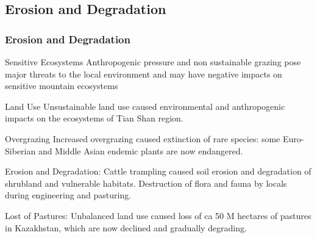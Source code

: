 \documentclass[pdflatex,compress,8pt,
	xcolor={dvipsnames,dvipsnames,svgnames,x11names,table},
	hyperref={colorlinks = true,
	breaklinks = true, 
	urlcolor = NavyBlue, 
	breaklinks = true}]{beamer}
\begin{document}
\subsection{Erosion and Degradation}
\begin{frame}\frametitle{Erosion and Degradation}

\begin{alertblock}{Sensitive Ecosystems}
Anthropogenic pressure and non sustainable grazing pose major threats to the local environment and may have negative impacts on sensitive mountain ecosystems
\end{alertblock}

\begin{block}{Land Use}
Unsustainable land use caused environmental and anthropogenic impacts on the ecosystems of Tian Shan region. 
\end{block}

\begin{block}{Overgrazing}
Increased overgrazing caused extinction of rare species: some Euro-Siberian and Middle Asian endemic plants are now endangered.
\end{block}

\begin{examples}{Erosion and Degradation:}
Cattle trampling caused soil erosion and degradation of shrubland and vulnerable habitats. Destruction of flora and fauna by locals during engineering and pasturing. 
\end{examples}

\begin{examples}{Lost of Pastures:}
Unbalanced land use caused loss of ca 50 M hectares of pastures in Kazakhstan, which are now declined and gradually degrading.
\end{examples}


\end{frame}
\end{document}
